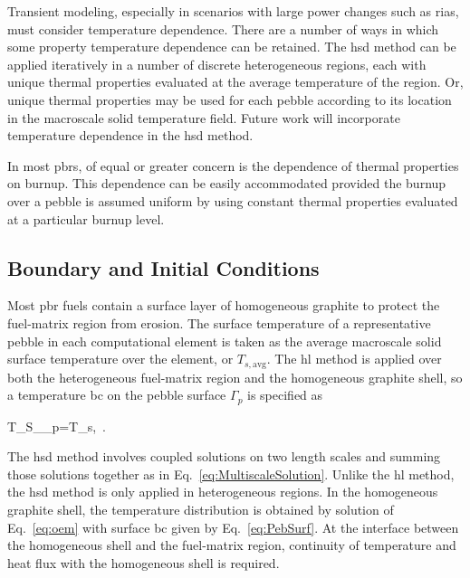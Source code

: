 Transient modeling, especially in scenarios with large power changes such as \glspl{ria}, must consider temperature dependence. There are a number of ways in which some property temperature dependence can be retained. The \gls{hsd} method can be applied iteratively in a number of discrete heterogeneous regions, each with unique thermal properties evaluated at the average temperature of the region. Or, unique thermal properties may be used for each pebble according to its location in the macroscale solid temperature field. Future work will incorporate temperature dependence in the \gls{hsd} method.

In most \glspl{pbr}, of equal or greater concern is the dependence of thermal properties on burnup. This dependence can be easily accommodated provided the burnup over a pebble is assumed uniform by using constant thermal properties evaluated at a particular burnup level.

\subsection{Boundary and Initial Conditions}
\label{sec:BCsMesoMicro}

Most \gls{pbr} fuels contain a surface layer of homogeneous graphite to protect the fuel-matrix region from erosion. The surface temperature of a representative pebble in each computational element is taken as the average macroscale solid surface temperature over the element, or \(T_{s,\text{avg}}\). The \gls{hl} method is applied over both the heterogeneous fuel-matrix region and the homogeneous graphite shell, so a temperature \gls{bc} on the pebble surface \(\Gamma_p\) is specified as

\beq
\label{eq:PebSurf}
T_S\rvert_{\Gamma_p}=T_{s,}\ .
\eeq

\noindent The \gls{hsd} method involves coupled solutions on two length scales and summing those solutions together as in Eq.\ \eqref{eq:MultiscaleSolution}. Unlike the \gls{hl} method, the \gls{hsd} method is only applied in heterogeneous regions. In the homogeneous graphite shell, the temperature distribution is obtained by solution of Eq.\ \eqref{eq:oem} with surface \gls{bc} given by Eq.\ \eqref{eq:PebSurf}. At the interface between the homogeneous shell and the fuel-matrix region, continuity of temperature and heat flux with the homogeneous shell is required.


